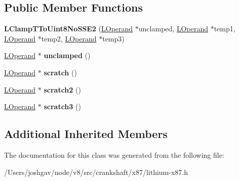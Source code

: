 \subsection*{Public Member Functions}
\begin{DoxyCompactItemize}
\item 
{\bfseries L\+Clamp\+T\+To\+Uint8\+No\+S\+S\+E2} (\hyperlink{classv8_1_1internal_1_1_l_operand}{L\+Operand} $\ast$unclamped, \hyperlink{classv8_1_1internal_1_1_l_operand}{L\+Operand} $\ast$temp1, \hyperlink{classv8_1_1internal_1_1_l_operand}{L\+Operand} $\ast$temp2, \hyperlink{classv8_1_1internal_1_1_l_operand}{L\+Operand} $\ast$temp3)\hypertarget{classv8_1_1internal_1_1_l_clamp_t_to_uint8_no_s_s_e2_afc42d7a0a1c4fa13fa7efe48154e06a5}{}\label{classv8_1_1internal_1_1_l_clamp_t_to_uint8_no_s_s_e2_afc42d7a0a1c4fa13fa7efe48154e06a5}

\item 
\hyperlink{classv8_1_1internal_1_1_l_operand}{L\+Operand} $\ast$ {\bfseries unclamped} ()\hypertarget{classv8_1_1internal_1_1_l_clamp_t_to_uint8_no_s_s_e2_ac3370207f1617c47bc9fa22414dcc8f0}{}\label{classv8_1_1internal_1_1_l_clamp_t_to_uint8_no_s_s_e2_ac3370207f1617c47bc9fa22414dcc8f0}

\item 
\hyperlink{classv8_1_1internal_1_1_l_operand}{L\+Operand} $\ast$ {\bfseries scratch} ()\hypertarget{classv8_1_1internal_1_1_l_clamp_t_to_uint8_no_s_s_e2_ab6626119085fd21b020948bc1c803fc2}{}\label{classv8_1_1internal_1_1_l_clamp_t_to_uint8_no_s_s_e2_ab6626119085fd21b020948bc1c803fc2}

\item 
\hyperlink{classv8_1_1internal_1_1_l_operand}{L\+Operand} $\ast$ {\bfseries scratch2} ()\hypertarget{classv8_1_1internal_1_1_l_clamp_t_to_uint8_no_s_s_e2_a50cc5bce5b87b757e36baae201ce13b4}{}\label{classv8_1_1internal_1_1_l_clamp_t_to_uint8_no_s_s_e2_a50cc5bce5b87b757e36baae201ce13b4}

\item 
\hyperlink{classv8_1_1internal_1_1_l_operand}{L\+Operand} $\ast$ {\bfseries scratch3} ()\hypertarget{classv8_1_1internal_1_1_l_clamp_t_to_uint8_no_s_s_e2_a25a1b48b7a57255c82c1a7cc6ea132d2}{}\label{classv8_1_1internal_1_1_l_clamp_t_to_uint8_no_s_s_e2_a25a1b48b7a57255c82c1a7cc6ea132d2}

\end{DoxyCompactItemize}
\subsection*{Additional Inherited Members}


The documentation for this class was generated from the following file\+:\begin{DoxyCompactItemize}
\item 
/\+Users/joshgav/node/v8/src/crankshaft/x87/lithium-\/x87.\+h\end{DoxyCompactItemize}
